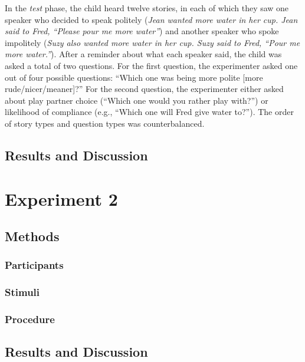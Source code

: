 \documentclass[10pt, letterpaper]{article}
\begin{document}
In the \emph{test} phase, the child heard twelve stories, in each of
which they saw one speaker who decided to speak politely (\emph{Jean
wanted more water in her cup. Jean said to Fred, ``Please pour me more
water''}) and another speaker who spoke impolitely (\emph{Suzy also
wanted more water in her cup. Suzy said to Fred, ``Pour me more
water.''}). After a reminder about what each speaker said, the child was
asked a total of two questions. For the first question, the experimenter
asked one out of four possible questions: ``Which one was being more
polite {[}more rude/nicer/meaner{]}?'' For the second question, the
experimenter either asked about play partner choice (``Which one would
you rather play with?'') or likelihood of compliance (e.g., ``Which one
will Fred give water to?''). The order of story types and question types
was counterbalanced.

\subsection{Results and Discussion}\label{results-and-discussion}

\section{Experiment 2}\label{experiment-2}

\subsection{Methods}\label{methods-1}

\subsubsection{Participants}\label{participants-1}

\subsubsection{Stimuli}\label{stimuli-1}

\subsubsection{Procedure}\label{procedure-1}

\subsection{Results and Discussion}\label{results-and-discussion-1}
\end{document}
